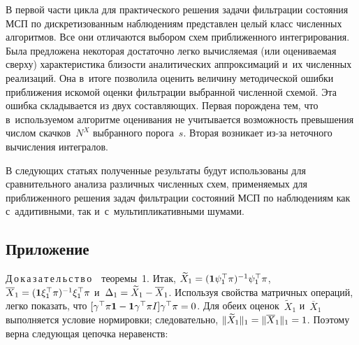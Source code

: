 \begin{multicols}{2}
  \vspace*{-4pt}
 
 В первой части цикла для практического решения задачи фильтрации 
 состояния МСП по дискретизованным наблюдениям представлен целый класс 
 численных алгоритмов. Все они отличаются выбором схем приближенного 
 интегрирования. Была предложена некоторая достаточно легко вычисляемая 
 (или оцениваемая сверху) характеристика близости аналитических аппроксимаций и~их 
 численных реализаций. Она в~итоге позволила оценить величину методической ошибки
  приближения искомой оценки фильтрации выбранной чис\-лен\-ной схемой. Эта ошибка 
  складывается из двух составляющих. Первая порождена тем, что в~используемом 
  алгоритме оценивания не учитывается возможность превышения числом скачков~$N^X$ 
  выбранного порога~$s$. Вторая возникает из-за неточного вычисления интегралов.
 
 В следующих статьях полученные результаты будут использованы для 
 сравнительного анализа различных численных схем, применяемых для 
 приближенного решения задач фильтрации состояний МСП по наблюдениям 
 как с~аддитивными, так и~с~мультипликативными шумами.
 
 \vspace*{-6pt}
 
{\small \subsection*{\raggedleft Приложение}
  
  \noindent
Д\,о\,к\,а\,з\,а\,т\,е\,л\,ь\,с\,т\,в\,о\ \ теоремы~1.
Итак, $\widetilde{X}_1 \hm= (\mathbf{1}\psi_1^{\top}\pi)^{-1}\psi_1^{\top}\pi$, 
$\overline{X}_1 \hm= (\mathbf{1}\xi_1^{\top}\pi)^{-1}\xi_1^{\top}\pi$ 
и~$\Delta_1 \hm= \widetilde{X}_1\hm - \overline{X}_1$. 
Используя свойства матричных операций, легко показать, что 
$[\gamma^{\top}\pi\mathbf{1}\hm-\mathbf{1}\gamma^{\top}\pi I]\gamma^{\top}\pi\hm=0$.
 Для обеих оценок~$\widetilde{X}_1$ и~$\overline{X}_1$ выполняется условие 
 нормировки; следовательно, $\|\widetilde{X}_1\|_1 \hm= \|\overline{X}_1\|_1\hm=1$. 
 Поэтому верна следующая цепочка неравенств:
 
}
\end{multicols}
